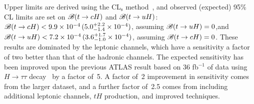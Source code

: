 Upper limits are derived using the CL$_{\textrm{s}}$ method~\cite{Junk:1999kv,Read:2002hq}, and  
observed (expected) 95\% CL limits are set on $\mathscr{B}(t\to cH)$ and $\mathscr{B}(t\to uH)$:
$\mathscr{B}(t\to cH)<9.9 \times 10^{-4}\,(5.0^{+2.2}_{-1.4}\times10^{-4})$, assuming $\mathscr{B}(t\to uH)=0$,and $\mathscr{B}(t\to uH)<7.2 \times 10^{-4}\,(3.6^{+1.7}_{-1.0}\times10^{-4})$, assuming $\mathscr{B}(t\to cH)=0$.
These results are dominated by the leptonic channels, which have a sensitivity a factor of two better than that of the hadronic channels.
The expected sensitivity has been improved upon the previous ATLAS result based on 36 fb$^{-1}$ of data using $H\to \tau\tau$ decay~\cite{fcnc36} by a factor of~5. A factor of~2 improvement in sensitivity comes from the larger dataset, and a further factor of~2.5 comes from including
additional leptonic channels, $tH$ production, and improved techniques.

